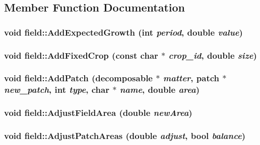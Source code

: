 \subsection{Member Function Documentation}
\hypertarget{classfield_a3e63fc647748d3e072b82aeed08f2727}{
\subsubsection[{AddExpectedGrowth}]{\setlength{\rightskip}{0pt plus 5cm}void field::AddExpectedGrowth (int {\em period}, \/  double {\em value})}}
\label{classfield_a3e63fc647748d3e072b82aeed08f2727}
\hypertarget{classfield_a361ad422a8357695a389c747024f01e8}{
\subsubsection[{AddFixedCrop}]{\setlength{\rightskip}{0pt plus 5cm}void field::AddFixedCrop (const char $\ast$ {\em crop\_\-id}, \/  double {\em size})}}
\label{classfield_a361ad422a8357695a389c747024f01e8}
\hypertarget{classfield_a78efd8f2b5f220ddfec85b4ad847d79a}{
\subsubsection[{AddPatch}]{\setlength{\rightskip}{0pt plus 5cm}void field::AddPatch ({\bf decomposable} $\ast$ {\em matter}, \/  {\bf patch} $\ast$ {\em new\_\-patch}, \/  int {\em type}, \/  char $\ast$ {\em name}, \/  double {\em area})}}
\label{classfield_a78efd8f2b5f220ddfec85b4ad847d79a}
\hypertarget{classfield_adde20822cfc7a99c9ed35b831353bcbb}{
\subsubsection[{AdjustFieldArea}]{\setlength{\rightskip}{0pt plus 5cm}void field::AdjustFieldArea (double {\em newArea})}}
\label{classfield_adde20822cfc7a99c9ed35b831353bcbb}
\hypertarget{classfield_a7e446412f0c24c7a58401dab58c10a40}{
\subsubsection[{AdjustPatchAreas}]{\setlength{\rightskip}{0pt plus 5cm}void field::AdjustPatchAreas (double {\em adjust}, \/  bool {\em balance})}}
